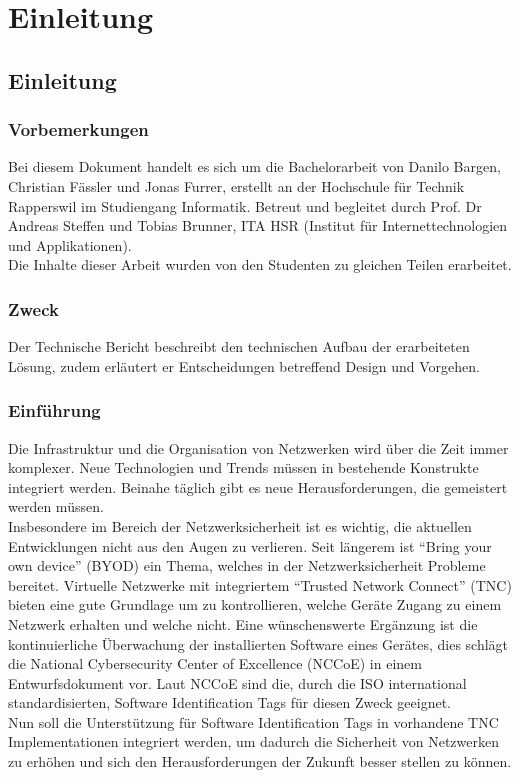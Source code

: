 \chapter{Einleitung}
\section{Einleitung}

\subsection{Vorbemerkungen}
Bei diesem Dokument handelt es sich um die Bachelorarbeit von Danilo Bargen,
Christian Fässler und Jonas Furrer, erstellt an der Hochschule für Technik Rapperswil 
im Studiengang Informatik. Betreut und begleitet durch Prof. Dr
Andreas Steffen und Tobias Brunner, ITA HSR (Institut für Internettechnologien
und Applikationen).\\
Die Inhalte dieser Arbeit wurden von den Studenten zu gleichen Teilen
erarbeitet.

\subsection{Zweck}
Der Technische Bericht beschreibt den technischen Aufbau der erarbeiteten Lösung,
zudem erläutert er Entscheidungen betreffend Design und Vorgehen.

\subsection{Einführung}
Die Infrastruktur und die Organisation von Netzwerken wird über die Zeit immer
komplexer. Neue Technologien und Trends müssen in bestehende Konstrukte
integriert werden. Beinahe täglich gibt es neue Herausforderungen, die
gemeistert werden müssen.\\
Insbesondere im Bereich der Netzwerksicherheit ist es wichtig, die aktuellen
Entwicklungen nicht aus den Augen zu verlieren. Seit längerem ist \enquote{Bring
your own device} (BYOD) ein Thema, welches in der Netzwerksicherheit Probleme
bereitet. Virtuelle Netzwerke mit integriertem \enquote{Trusted Network Connect}
(TNC) bieten eine gute Grundlage um zu kontrollieren, welche Geräte
Zugang zu einem Netzwerk erhalten und welche nicht. Eine wünschenswerte
Ergänzung ist die kontinuierliche Überwachung der installierten Software eines
Gerätes, dies schlägt die National Cybersecurity Center of Excellence (NCCoE) in
einem Entwurfsdokument vor. Laut NCCoE sind die, durch die ISO international
standardisierten, Software Identification Tags für diesen Zweck geeignet.\\
Nun soll die Unterstützung für Software Identification Tags in vorhandene TNC
Implementationen integriert werden, um dadurch die Sicherheit von Netzwerken zu
erhöhen und sich den Herausforderungen der Zukunft besser stellen zu können.